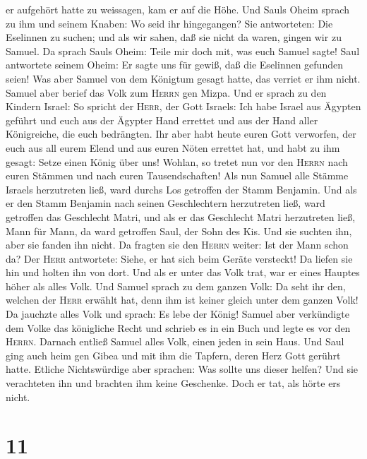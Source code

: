 er aufgehört hatte zu weissagen, kam er auf die Höhe. 
Und Sauls Oheim sprach zu ihm und seinem Knaben: Wo seid ihr
hingegangen? Sie antworteten: Die Eselinnen zu suchen; und als wir
sahen, daß sie nicht da waren, gingen wir zu Samuel.  Da
sprach Sauls Oheim: Teile mir doch mit, was euch Samuel sagte!
 Saul antwortete seinem Oheim: Er sagte uns für gewiß,
daß die Eselinnen gefunden seien! Was aber Samuel von dem Königtum
gesagt hatte, das verriet er ihm nicht.  Samuel aber
berief das Volk zum \textsc{Herrn} gen Mizpa.  Und er
sprach zu den Kindern Israel: So spricht der \textsc{Herr}, der Gott
Israels: Ich habe Israel aus Ägypten geführt und euch aus der Ägypter
Hand errettet und aus der Hand aller Königreiche, die euch bedrängten.
 Ihr aber habt heute euren Gott verworfen, der euch aus
all eurem Elend und aus euren Nöten errettet hat, und habt zu ihm
gesagt: Setze einen König über uns! Wohlan, so tretet nun vor den
\textsc{Herrn} nach euren Stämmen und nach euren Tausendschaften!
 Als nun Samuel alle Stämme Israels herzutreten ließ,
ward durchs Los getroffen der Stamm Benjamin.  Und als er
den Stamm Benjamin nach seinen Geschlechtern herzutreten ließ, ward
getroffen das Geschlecht Matri, und als er das Geschlecht Matri
herzutreten ließ, Mann für Mann, da ward getroffen Saul, der Sohn des
Kis. Und sie suchten ihn, aber sie fanden ihn nicht.  Da
fragten sie den \textsc{Herrn} weiter: Ist der Mann schon da? Der
\textsc{Herr} antwortete: Siehe, er hat sich beim Geräte versteckt!
 Da liefen sie hin und holten ihn von dort. Und als er
unter das Volk trat, war er eines Hauptes höher als alles Volk.
 Und Samuel sprach zu dem ganzen Volk: Da seht ihr den,
welchen der \textsc{Herr} erwählt hat, denn ihm ist keiner gleich unter
dem ganzen Volk! Da jauchzte alles Volk und sprach: Es lebe der König!
 Samuel aber verkündigte dem Volke das königliche Recht
und schrieb es in ein Buch und legte es vor den \textsc{Herrn}. Darnach
entließ Samuel alles Volk, einen jeden in sein Haus.  Und
Saul ging auch heim gen Gibea und mit ihm die Tapfern, deren Herz Gott
gerührt hatte.  Etliche Nichtswürdige aber sprachen: Was
sollte uns dieser helfen? Und sie verachteten ihn und brachten ihm keine
Geschenke. Doch er tat, als hörte er\textquotesingle s nicht.

\hypertarget{section-10}{%
\section{11}\label{section-10}}


